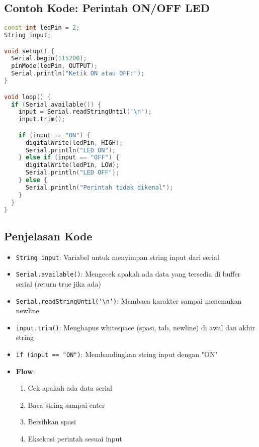 \documentclass[12pt,a4paper]{article}
\begin{document}
\subsection{Contoh Kode: Perintah ON/OFF LED}

\begin{lstlisting}[language=C++, caption={Kontrol LED via Serial}]
const int ledPin = 2;
String input;

void setup() {
  Serial.begin(115200);
  pinMode(ledPin, OUTPUT);
  Serial.println("Ketik ON atau OFF:");
}

void loop() {
  if (Serial.available()) {
    input = Serial.readStringUntil('\n');
    input.trim();

    if (input == "ON") {
      digitalWrite(ledPin, HIGH);
      Serial.println("LED ON");
    } else if (input == "OFF") {
      digitalWrite(ledPin, LOW);
      Serial.println("LED OFF");
    } else {
      Serial.println("Perintah tidak dikenal");
    }
  }
}
\end{lstlisting}

\subsection{Penjelasan Kode}
\begin{itemize}
    \item \texttt{String input}: Variabel untuk menyimpan string input dari serial
    \item \texttt{Serial.available()}: Mengecek apakah ada data yang tersedia di buffer serial (return true jika ada)
    \item \texttt{Serial.readStringUntil('\textbackslash n')}: Membaca karakter sampai menemukan newline
    \item \texttt{input.trim()}: Menghapus whitespace (spasi, tab, newline) di awal dan akhir string
    \item \texttt{if (input == "ON")}: Membandingkan string input dengan "ON"
    \item \textbf{Flow}:
    \begin{enumerate}
        \item Cek apakah ada data serial
        \item Baca string sampai enter
        \item Bersihkan spasi
        \item Eksekusi perintah sesuai input
    \end{enumerate}
\end{itemize}
\end{document}
